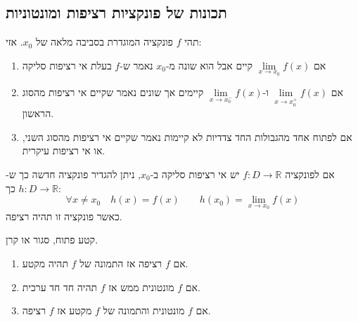 \documentclass{tstextbook}
\begin{document}
\subsection{תכונות של פונקציות רציפות ומונטוניות}

\begin{definition}
תהי \(f\) פונקציה המוגדרת בסביבה מלאה של \(x_{0}\). אזי:

  \begin{enumerate}
    \item אם \(\underset{ x \to x_{0} }{\lim }f(x)\) קיים אבל הוא שונה מ-\(x_{0}\) נאמר ש-\(f\) בעלת אי רציפות סליקה 


    \item אם \(\underset{ x \to x_{0}^{+} }{\lim }f(x)\) ו-\(\underset{ x \to x_{0}^{-} }{\lim }f(x)\) קיימים אך שונים נאמר שקיים אי רציפות מהסוג הראשון. 


    \item אם לפתוח אחד מהגבולות החד צדדיות לא קיימות נאמר שקיים אי רציפות מהסוג השני, או אי רציפות עיקרית. 


  \end{enumerate}
\end{definition}
\begin{definition}
אם לפונקציה \(f:D\to \mathbb{R}\) יש אי רציפות סליקה ב-\(x_{0}\), ניתן להגדיר פונקציה חדשה כך ש-\(h:D\to \mathbb{R}\) כך:
$$\forall x \neq x_{0}\quad h(x)=f(x)\qquad h(x_{0})=\lim_{ x \to x_{0} } f(x)$$
כאשר פונקציה זו תהיה רציפה.

\end{definition}
\begin{definition}[מקטע]
קטע פתוח, סגור או קרן.

\end{definition}
\begin{proposition}
  \begin{enumerate}
    \item אם \(f\) רציפה אז התמונה של \(f\) תהיה מקטע. 


    \item אם \(f\) מונטונית ממש אז \(f\) תהיה חד חד ערכית. 


    \item אם \(f\) מונטונית והתמונה של \(f\) מקטע אז \(f\) רציפה. 


  \end{enumerate}
\end{proposition}
\end{document}
